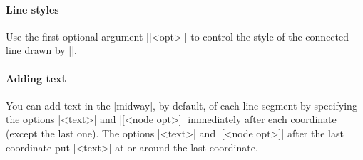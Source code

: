 \paragraph{Line styles}
Use the first optional argument |[<opt>]| to control the style of the connected line drawn by |\tzlines|.

\begin{tzcode}{.3}
\end{tzcode}

\paragraph{Adding text}

You can add text in the |midway|, by default, of each line segment by specifying the options |{<text>}| and |[<node opt>]| immediately after each coordinate (except the last one).
The options |{<text>}| and |[<node opt>]| after the last coordinate put |<text>| at or around the last coordinate.


\begin{tzcode}{.3}
\end{tzcode}

%
%

